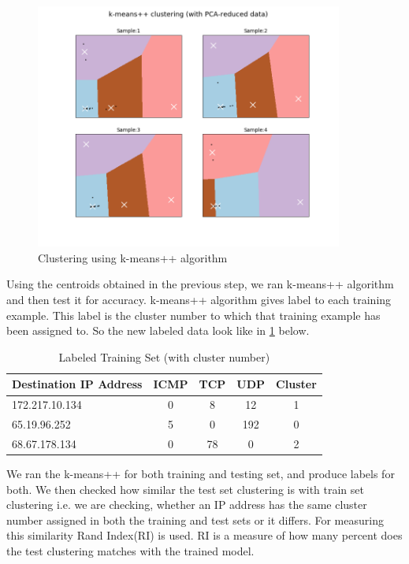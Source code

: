 \documentclass[12pt,oneside,a4paper]{article}
\begin{document}
\begin{figure}[H]
\centering
\includegraphics[width=0.90\textwidth]{kemans-clustering.png}
\caption{Clustering using k-means++ algorithm} \label{fig:k-means-clustering}
\end{figure}

Using the centroids obtained in the previous step, we ran k-means++ algorithm and then test it for accuracy. k-means++ algorithm gives label to each training example. This label is the cluster number to which that training example has been assigned to. So the new labeled data look like in \ref{table:labeled-set} below.

\begin{table}[H]
\centering
  \begin{tabular}{| l | c | c | c | c |}
    \hline
    {Destination IP Address}  &ICMP  &TCP &UDP  &Cluster \\
    \hline
    172.217.10.134  & 0     & 8     & 12  &1  \\ \hline
    65.19.96.252    & 5     & 0     & 192 &0  \\ \hline
    68.67.178.134   & 0     & 78    & 0   &2  \\ \hline
  \end{tabular}
\caption{Labeled Training Set (with cluster number)} \label{table:labeled-set}
\end{table}

We ran the k-means++ for both training and testing set, and produce labels for both. We then checked how similar the test set clustering is with train set clustering i.e. we are checking, whether an IP address has the same cluster number assigned in both the training and test sets or it differs. For measuring this similarity Rand Index(RI)\cite{ri-index} is used. RI is a measure of how many percent does the test clustering matches with the trained model.
\end{document}

